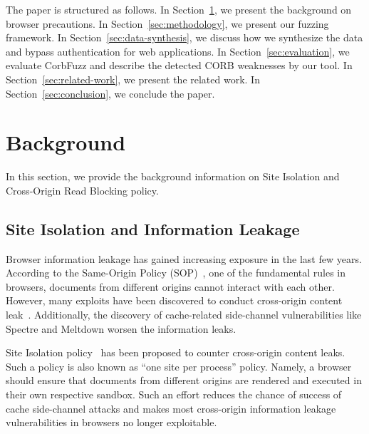 \documentclass[10pt,conference]{IEEEtran}
\begin{document}
The paper is structured as follows. 
In Section~\ref{sec:background}, we present the background on browser precautions. 
{
In Section~\ref{sec:methodology}, we present our fuzzing framework.
In Section~\ref{sec:data-synthesis}, we discuss how we synthesize the data and bypass authentication for web applications.}
In Section~\ref{sec:evaluation}, we evaluate CorbFuzz and describe the detected CORB weaknesses by our tool.
In Section~\ref{sec:related-work}, we present the related work.
In Section~\ref{sec:conclusion}, we conclude the paper.


\section{Background}
\label{sec:background}
In this section, we provide the background information on Site Isolation and Cross-Origin Read Blocking policy.






\subsection{Site Isolation and Information Leakage}
Browser information leakage has gained increasing exposure in the last few years. According to the Same-Origin Policy (SOP)~\cite{203852}, one of the fundamental rules in browsers, documents from different origins cannot interact with each other. However, many exploits have been discovered to conduct cross-origin content leak~\cite{gulmezoglu_zankl_eisenbarth_sunar_2017,jana_shmatikov_2012,kim_lee_kim_2016,lee_kim_kim_kim_2014,spreitzer_griesmayr_korak_mangard_2016,karami_ilia_polakis_2021}. Additionally, the discovery of cache-related side-channel vulnerabilities like Spectre\cite{Spectre} and Meltdown\cite{Meltdown} worsen the information leaks.

Site Isolation policy~\cite{siteisolation,siteisolationchromium} has been proposed to counter cross-origin content leaks. Such a policy is also known as ``one site per process'' policy. Namely, a browser should ensure that documents from different origins are rendered and executed in their own respective sandbox. Such an effort reduces the chance of success of cache side-channel attacks and makes most cross-origin information leakage vulnerabilities in browsers no longer exploitable. %
\end{document}
